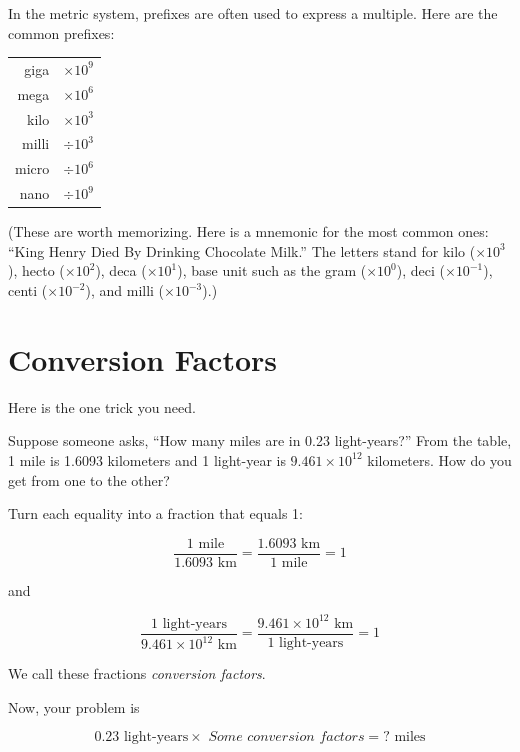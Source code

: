 In the metric system, prefixes are often used to express a multiple. Here are the common prefixes:

\begin{mdframed}[style=important, frametitle={Common Prefixes for Metric Units}]

\begin{tabular}{r | l}
giga  & $\times 10^{9}$\\
mega  & $\times 10^{6}$\\
kilo  & $\times 10^{3}$\\
milli  & $\div 10^{3}$\\
micro  & $\div 10^{6}$\\
nano  & $\div 10^{9}$\\
\end{tabular}

(These are worth memorizing. Here is a mnemonic for the most common ones: ``King Henry Died By Drinking Chocolate Milk.'' The letters stand for kilo ($\times 10^{3}$), hecto ($\times 10^{2}$), deca ($\times 10^{1}$), base unit such as the gram ($\times 10^{0}$), deci ($\times 10^{-1}$), centi ($\times 10^{-2}$), and milli ($\times 10^{-3}$).)
\end{mdframed}

\section{Conversion Factors}

Here is the one trick you need.

Suppose someone asks, ``How many miles are in 0.23 light-years?'' From the table, 1 mile is 1.6093 kilometers and 1 light-year is $9.461 \times 10^{12}$ kilometers. How do you get from one to the other?

Turn each equality into a fraction that equals 1:

$$\frac{1 \text{ mile}}{1.6093 \text{ km}} = \frac{1.6093 \text{ km}}{1 \text{ mile}} = 1$$

and

$$\frac{1 \text{ light-years}}{9.461 \times 10^{12} \text{ km}} = \frac{9.461 \times 10^{12} \text{ km}}{1 \text{ light-years}} = 1$$

We call these fractions \textit{conversion factors}.

Now, your problem is

$$0.23 \text{ light-years} \times \textit{ Some conversion factors} = ? \text{ miles}$$

